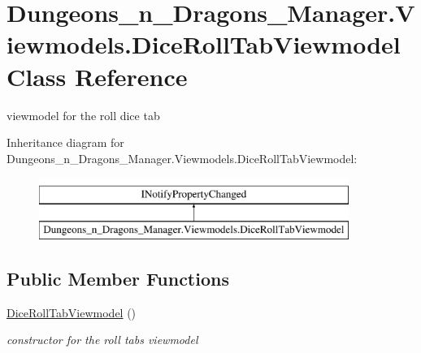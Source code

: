 \hypertarget{class_dungeons__n___dragons___manager_1_1_viewmodels_1_1_dice_roll_tab_viewmodel}{}\section{Dungeons\+\_\+n\+\_\+\+Dragons\+\_\+\+Manager.\+Viewmodels.\+Dice\+Roll\+Tab\+Viewmodel Class Reference}
\label{class_dungeons__n___dragons___manager_1_1_viewmodels_1_1_dice_roll_tab_viewmodel}


viewmodel for the roll dice tab  


Inheritance diagram for Dungeons\+\_\+n\+\_\+\+Dragons\+\_\+\+Manager.\+Viewmodels.\+Dice\+Roll\+Tab\+Viewmodel\+:\begin{figure}[H]
\begin{center}
\leavevmode
\includegraphics[height=2.000000cm]{class_dungeons__n___dragons___manager_1_1_viewmodels_1_1_dice_roll_tab_viewmodel}
\end{center}
\end{figure}
\subsection*{Public Member Functions}
\begin{DoxyCompactItemize}
\item 
\mbox{\hyperlink{class_dungeons__n___dragons___manager_1_1_viewmodels_1_1_dice_roll_tab_viewmodel_ab6129757ad68b42d45e024b902561508}{Dice\+Roll\+Tab\+Viewmodel}} ()
\begin{DoxyCompactList}\small\item\em constructor for the roll tabs viewmodel \end{DoxyCompactList}\end{DoxyCompactItemize}
